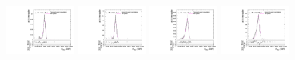 \begin{figure}[htpb]
  \centering
  \includegraphics[width=0.2\textwidth]{fig/2Dfit/templateVsReco_VBFWprToWZ2000_r0_MVV_mu_HP_nobb_LDy_linear.pdf}
  \includegraphics[width=0.2\textwidth]{fig/2Dfit/templateVsReco_VBFWprToWZ2000_r0_MVV_mu_LP_nobb_LDy_linear.pdf}
  \includegraphics[width=0.2\textwidth]{fig/2Dfit/templateVsReco_VBFWprToWZ2000_r0_MVV_mu_HP_nobb_HDy_linear.pdf}
  \includegraphics[width=0.2\textwidth]{fig/2Dfit/templateVsReco_VBFWprToWZ2000_r0_MVV_mu_LP_nobb_HDy_linear.pdf}\\

\end{figure}
